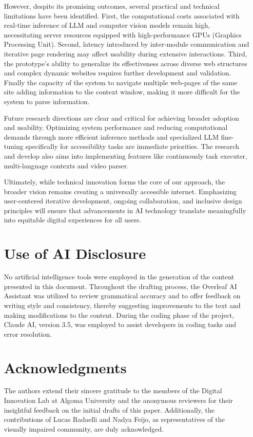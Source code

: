 \documentclass[conference]{IEEEtran}
\begin{document}
However, despite its promising outcomes, several practical and technical limitations have been identified. First, the computational costs associated with real-time inference of LLM and computer vision models remain high, necessitating server resources equipped with high-performance GPUs (Graphics Processing Unit). Second, latency introduced by inter-module communication and iterative page rendering may affect usability during extensive interactions. Third, the prototype's ability to generalize its effectiveness across diverse web structures and complex dynamic websites requires further development and validation. Finally the capacity of the system to navigate multiple web-pages of the same site adding information to the context window, making it more difficult for the system to parse information. 

Future research directions are clear and critical for achieving broader adoption and usability. Optimizing system performance and reducing computational demands through more efficient inference methods and specialized LLM fine-tuning specifically for accessibility tasks are immediate priorities. The research and develop also aims into implementing features like continuously task executer, multi-language contexts and video parser.

Ultimately, while technical innovation forms the core of our approach, the broader vision remains creating a universally accessible internet. Emphasizing user-centered iterative development, ongoing collaboration, and inclusive design principles will ensure that advancements in AI technology translate meaningfully into equitable digital experiences for all users.


\section*{Use of AI Disclosure}\label{ai-disclosure}
No artificial intelligence tools were employed in the generation of the content presented in this document. Throughout the drafting process, the Overleaf AI Assistant was utilized to review grammatical accuracy and to offer feedback on writing style and consistency, thereby suggesting improvements to the text and making modifications to the content. During the coding phase of the project, Claude AI, version 3.5, was employed to assist developers in coding tasks and error resolution.


\section*{Acknowledgments}\label{ai-disclosure}
The authors extend their sincere gratitude to the members of the Digital Innovation Lab at Algoma University and the anonymous reviewers for their insightful feedback on the initial drafts of this paper. Additionally, the contributions of Lucas Radaelli and Nadya Feijo, as representatives of the visually impaired community, are duly acknowledged.

\vfill


\end{document}
